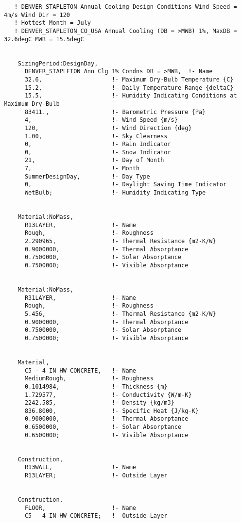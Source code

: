 \begin{lstlisting}
   ! DENVER_STAPLETON Annual Cooling Design Conditions Wind Speed = 4m/s Wind Dir = 120
   ! Hottest Month = July
   ! DENVER_STAPLETON_CO_USA Annual Cooling (DB = >MWB) 1%, MaxDB = 32.6degC MWB = 15.5degC


    SizingPeriod:DesignDay,
      DENVER_STAPLETON Ann Clg 1% Condns DB = >MWB,  !- Name
      32.6,                    !- Maximum Dry-Bulb Temperature {C}
      15.2,                    !- Daily Temperature Range {deltaC}
      15.5,                    !- Humidity Indicating Conditions at Maximum Dry-Bulb
      83411.,                  !- Barometric Pressure {Pa}
      4,                       !- Wind Speed {m/s}
      120,                     !- Wind Direction {deg}
      1.00,                    !- Sky Clearness
      0,                       !- Rain Indicator
      0,                       !- Snow Indicator
      21,                      !- Day of Month
      7,                       !- Month
      SummerDesignDay,         !- Day Type
      0,                       !- Daylight Saving Time Indicator
      WetBulb;                 !- Humidity Indicating Type


    Material:NoMass,
      R13LAYER,                !- Name
      Rough,                   !- Roughness
      2.290965,                !- Thermal Resistance {m2-K/W}
      0.9000000,               !- Thermal Absorptance
      0.7500000,               !- Solar Absorptance
      0.7500000;               !- Visible Absorptance


    Material:NoMass,
      R31LAYER,                !- Name
      Rough,                   !- Roughness
      5.456,                   !- Thermal Resistance {m2-K/W}
      0.9000000,               !- Thermal Absorptance
      0.7500000,               !- Solar Absorptance
      0.7500000;               !- Visible Absorptance


    Material,
      C5 - 4 IN HW CONCRETE,   !- Name
      MediumRough,             !- Roughness
      0.1014984,               !- Thickness {m}
      1.729577,                !- Conductivity {W/m-K}
      2242.585,                !- Density {kg/m3}
      836.8000,                !- Specific Heat {J/kg-K}
      0.9000000,               !- Thermal Absorptance
      0.6500000,               !- Solar Absorptance
      0.6500000;               !- Visible Absorptance


    Construction,
      R13WALL,                 !- Name
      R13LAYER;                !- Outside Layer


    Construction,
      FLOOR,                   !- Name
      C5 - 4 IN HW CONCRETE;   !- Outside Layer



\end{lstlisting}
